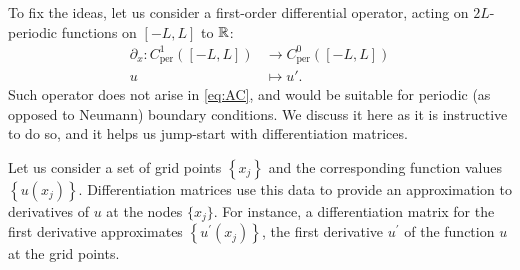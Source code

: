 \documentclass[a4paper]{siamart220329}
\theoremstyle{plain}
\begin{document}
To fix the ideas, let us consider a first-order differential operator, acting on
$2L$-periodic functions on $[-L,L]$ to $\mathbb{R}$:
\begin{equation}\label{eq:dxPer}
  \begin{aligned}
    \partial_x \colon C^1_\textrm{per}([-L,L]) & \to C^0_\textrm{per}([-L,L]) \\
                                  u     & \mapsto u'.
  \end{aligned}
\end{equation}
Such operator does not arise in \cref{eq:AC}, and would be suitable for periodic (as
opposed to Neumann) boundary conditions. We discuss it here as it is instructive to
do so, and it helps us jump-start with differentiation matrices.

Let us consider a set of grid points $\left\{x_{j}\right\}$ and the corresponding
function values $\left\{u\left(x_{j}\right)\right\}$. Differentiation matrices use
this data to provide an approximation to derivatives of $u$ at the nodes $\{x_j\}$.
For instance, a differentiation matrix for the first derivative approximates
$\left\{u^{\prime}\left(x_{j}\right)\right\}$, the first derivative $u^{\prime}$ of
the function $u$ at the grid points.
\end{document}
